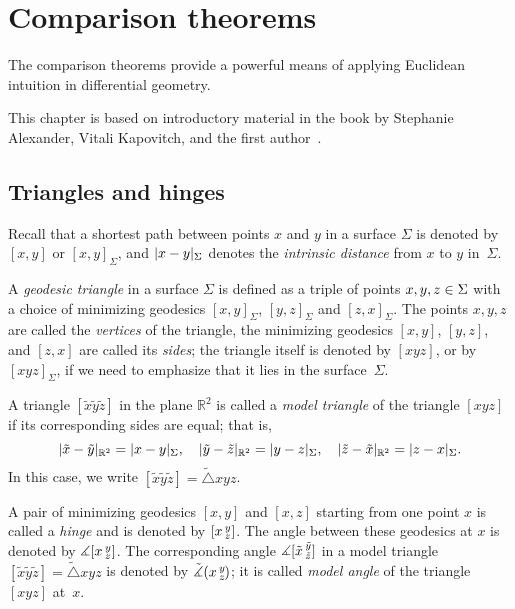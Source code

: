 \chapter{Comparison theorems}
\label{chap:comparison}

The comparison theorems provide a powerful means of applying Euclidean intuition in differential geometry.

This chapter is based on introductory material in the book by Stephanie Alexander, Vitali Kapovitch, and the first author~\cite{alexander-kapovitch-petrunin2027}.

\section{Triangles and hinges}

Recall that a shortest path between points $x$ and $y$ in a surface $\Sigma$ is denoted by $[x,y]$ or $[x,y]_\Sigma$, and
$\dist{x}{y}\Sigma$ denotes the \emph{intrinsic distance} from $x$ to $y$ in~$\Sigma$.

A \emph{geodesic triangle} in a surface $\Sigma$ is defined as a triple of points $x,y,z\z\in \Sigma$ with a choice of minimizing geodesics $[x,y]_\Sigma$, $[y,z]_\Sigma$ and $[z,x]_\Sigma$.
The points $x,y,z$ are called the {}\emph{vertices} of the triangle,
the minimizing geodesics $[x,y]$, $[y,z]$, and $[z,x]$ are called its {}\emph{sides};
the triangle itself is denoted by $[xyz]$, or by $[xyz]_\Sigma$, if we need to emphasize that it lies in the surface~$\Sigma$.

A triangle $[\tilde x\tilde y\tilde z]$ in the plane $\mathbb{R}^2$ is called a \emph{model triangle} of the triangle $[xyz]$
if its corresponding sides are equal;
that is,
\[\dist{\tilde x}{\tilde y}{\mathbb{R}^2}=\dist{x}{y}\Sigma,
\quad
\dist{\tilde y}{\tilde z}{\mathbb{R}^2}=\dist{y}{z}\Sigma,
\quad
\dist{\tilde z}{\tilde x}{\mathbb{R}^2}=\dist{z}{x}\Sigma.
\]
In this case, we write $[\tilde x\tilde y\tilde z]=\tilde\triangle xyz$.

A pair of minimizing geodesics $[x,y]$ and $[x,z]$ starting from one point $x$ is called a \emph{hinge} and is denoted by $[x\,{}^{y}_{z}]$.
The angle between these geodesics at $x$ is denoted by $\measuredangle[x\,{}^{y}_{z}]$.
The corresponding angle $\measuredangle[\tilde x\,{}^{\tilde y}_{\tilde z}]$ in a model triangle $[\tilde x\tilde y\tilde z]=\tilde\triangle xyz$ is denoted by $\tilde\measuredangle(x\,{}^{y}_{z}\hspace{-0.2ex})$;
it is called \emph{model angle} of the triangle $[xyz]$ at~$x$.

